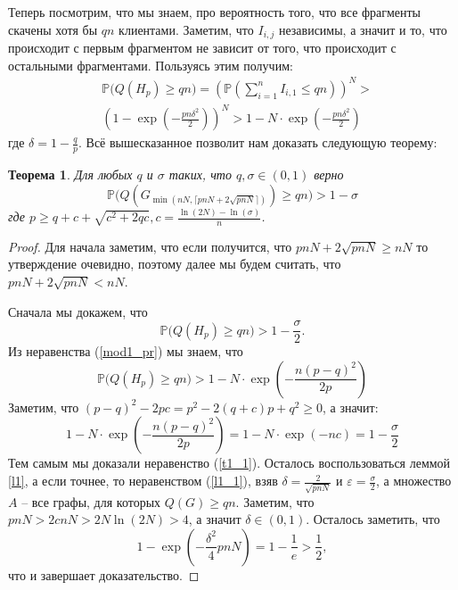 \documentclass[10pt]{article}
\newcommand{\PRob}{\mathbb P}
\newcommand{\leqs}{\leqslant}
\newcommand{\geqs}{\geqslant}
\newcommand{\eps}{\varepsilon}
\newtheorem{theorem}{Теорема}
\theoremstyle{named}
\begin{document}
Теперь посмотрим, что мы знаем, про вероятность того, что все фрагменты скачены хотя бы $qn$ клиентами.
Заметим, что $I_{i,j}$ независимы, а значит и то, что происходит с первым фрагментом не зависит от того, 
что происходит с остальными фрагментами. Пользуясь этим получим:
\begin{equation}\label{mod1_pr}\begin{aligned}
&\PRob\big(Q(H_p) \geqs q n\big) = \left( \PRob\left(\sum_{i=1}^n I_{i,1} \leqs qn\right)  \right)^N >
\\
&\left( 1 - \exp\left(- \frac{pn \delta^2}{2} \right) \right)^N > 1 - N \cdot \exp\left(- \frac{pn \delta^2}{2} \right) 
\end{aligned}\end{equation}
где $\delta = 1 - \frac{q}{p}$. Всё вышесказанное позволит нам доказать следующую теорему:

\begin{theorem}\label{t1}
Для любых $q$ и $\sigma$ таких, что $q, \sigma \in (0,1)$ верно
\begin{equation}
\PRob\big(Q(G_{\min(nN, \lceil pnN + 2\sqrt{pnN} \rceil)}) \geqs qn\big) > 1 - \sigma
\end{equation}
где $p \geqs q + c + \sqrt{c^2+2qc}, c = \frac{\ln(2N) - \ln(\sigma)}{n}$.
\end{theorem}
\begin{proof}
Для начала заметим, что если получится, что $pnN + 2\sqrt{pnN} \geqs nN$ то утверждение очевидно, 
поэтому далее мы будем считать, что $pnN + 2\sqrt{pnN} < nN$.

Сначала мы докажем, что 
\begin{equation}\label{t1_1}
\PRob\big(Q(H_p) \geqs qn \big) > 1 - \frac\sigma{2}.
\end{equation}
Из неравенства (\ref{mod1_pr}) мы знаем, что 
\begin{equation} \label{t1_t3_1}
\PRob\big(Q(H_p) \geqs qn \big) > 1 - N \cdot \exp\left(- \frac{n (p-q)^2}{2p} \right)
\end{equation}
Заметим, что $(p-q)^2 - 2pc = p^2 -2(q + c)p + q^2 \geqs 0$, а значит:
\begin{equation}
1 - N \cdot \exp\left(- \frac{n (p-q)^2}{2p} \right) = 1 - N \cdot \exp(-nc) = 1 - \frac\sigma{2}
\end{equation}
Тем самым мы доказали неравенство (\ref{t1_1}).
Осталось воспользоваться леммой \ref{l1}, а если точнее, то неравенством (\ref{l1_1}), взяв $\delta = \frac{2}{\sqrt{pnN}}$
 и $\eps = \frac\sigma{2}$, а множество $A$ -- все графы, для которых $Q(G) \geqs qn$.
Заметим, что $pnN > 2cnN> 2N\ln(2N) > 4$, а значит $\delta \in (0,1)$. Осталось заметить, что 
\begin{equation}
1 - \exp\left(-\frac{\delta^2}{4}pnN\right) = 1 - \frac{1}{e} > \frac{1}{2},
\end{equation}
что и завершает доказательство.
\end{proof}
\end{document}
